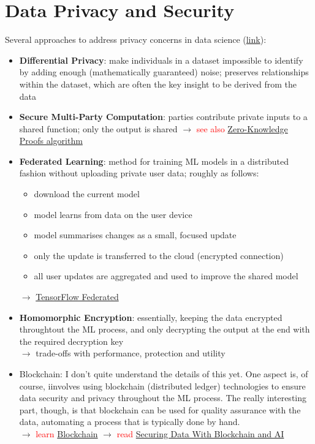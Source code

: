 \documentclass[a4, 12pt]{article}
\newcommand{\followup}[1]{\textcolor{red}{ #1 }}
\begin{document}
\newpage
\section{Data Privacy and Security}
Several approaches to address privacy concerns in data science (\href{https://analyticsindiamag.com/top-technologies-to-achieve-security-and-privacy-of-sensitive-data-in-ai-models/}{link}):
\begin{itemize}
    \item \textbf{Differential Privacy}: make individuals in a dataset impossible to identify by adding enough (mathematically guaranteed) noise; preserves relationships within the dataset, which are often the key insight to be derived from the data
    \item \textbf{Secure Multi-Party Computation}: parties contribute private inputs to a shared function; only the output is shared $\rightarrow$ \followup{see also \href{http://bid.berkeley.edu/projects/p4p/papers/duan08sdm.pdf}{Zero-Knowledge Proofs algorithm}}
    \item \textbf{Federated Learning}: method for training ML models in a distributed fashion without uploading private user data; roughly as follows: 
    \begin{itemize}
        \item download the current model
        \item model learns from data on the user device
        \item model summarises changes as a small, focused update
        \item only the update is transferred to the cloud (encrypted connection)
        \item all user updates are aggregated and used to improve the shared model
    \end{itemize}
    $\rightarrow$ \followup{\href{https://www.tensorflow.org/federated}{TensorFlow Federated}}
    \item \textbf{Homomorphic Encryption}: essentially, keeping the data encrypted throughtout the ML process, and only decrypting the output at the end with the required decryption key \\
    $\rightarrow$ trade-offs with performance, protection and utility
    \item Blockchain: I don't quite understand the details of this yet. One aspect is, of course, iinvolves using blockchain (distributed ledger) technologies to ensure data security and privacy throughout the ML process. The really interesting part, though, is that blockchain can be used for quality assurance with the data, automating a process that is typically done by hand. \\
    $\rightarrow$ \followup {learn \href{https://analyticsindiamag.com/why-you-should-consider-blockchain-as-a-technology-to-learn/}{Blockchain}} 
    $\rightarrow$ \followup{read \href{https://ieeexplore.ieee.org/abstract/document/8733072}{Securing Data With Blockchain and AI}}
\end{itemize}


\section{}






\end{document}

